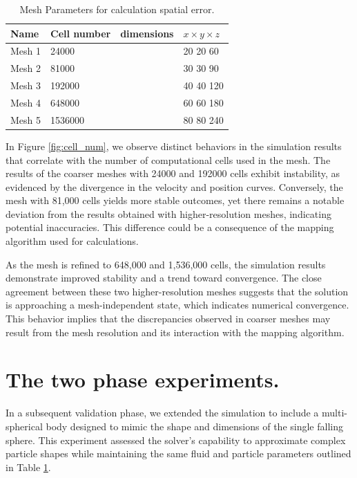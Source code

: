 \begin{table}[H]
    \centering
    \caption{Mesh Parameters for calculation spatial error. } \label{table1-chap4}
    \begin{tabular}{llll}
        \toprule
        \hline
        Name     & Cell number & dimensions&$x\times y \times z $\\
        \hline
        \midrule
        Mesh 1   & 24000 && 20 20 60\\
        Mesh 2 & 81000 & &30 30 90\\
        Mesh 3 & 192000 &&40 40 120 \\
        Mesh 4 & 648000 & &60 60 180 \\
        Mesh 5 & 1536000 & &80 80 240\\
        \hline
        \bottomrule
     \end{tabular}
\end{table}

In Figure \ref{fig:cell_num}, we observe distinct behaviors in the simulation results that correlate with the number of computational cells used in the mesh. The results of the coarser meshes with 24000 and 192000 cells exhibit instability, as evidenced by the divergence in the velocity and position curves. Conversely, the mesh with 81,000 cells yields more stable outcomes, yet there remains a notable deviation from the results obtained with higher-resolution meshes, indicating potential inaccuracies. This difference could be a consequence of the mapping algorithm used for calculations.

As the mesh is refined to 648,000 and 1,536,000 cells, the simulation results demonstrate improved stability and a trend toward convergence. The close agreement between these two higher-resolution meshes suggests that the solution is approaching a mesh-independent state, which indicates numerical convergence. This behavior implies that the discrepancies observed in coarser meshes may result from the mesh resolution and its interaction with the mapping algorithm. 


\section{The two phase experiments.}

In a subsequent validation phase, we extended the simulation to include a multi-spherical body designed to mimic the shape and dimensions of the single falling sphere. This experiment assessed the solver's capability to approximate complex particle shapes while maintaining the same fluid and particle parameters outlined in Table \ref{table1-chap4}.

